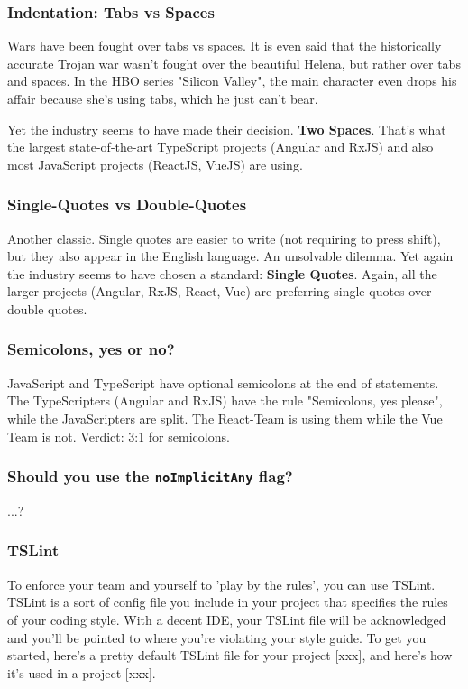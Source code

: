 \documentclass[12pt,a4paper]{report}
\begin{document}
\subsubsection{Indentation: Tabs vs Spaces}
Wars have been fought over tabs vs spaces. It is even said that the historically accurate Trojan war wasn't fought over the beautiful Helena, but rather over tabs and spaces. In the HBO series "Silicon Valley", the main character even drops his affair because she's using tabs, which he just can't bear.

Yet the industry seems to have made their decision. \textbf{Two Spaces}. That's what the largest state-of-the-art TypeScript projects (Angular and RxJS) and also most JavaScript projects (ReactJS, VueJS) are using.

\subsubsection{Single-Quotes vs Double-Quotes}
Another classic. Single quotes are easier to write (not requiring to press shift), but they also appear in the English language. An unsolvable dilemma. Yet again the industry seems to have chosen a standard: \textbf{Single Quotes}. Again, all the larger projects (Angular, RxJS, React, Vue) are preferring single-quotes over double quotes.

\subsubsection{Semicolons, yes or no?}
JavaScript and TypeScript have optional semicolons at the end of statements. The TypeScripters (Angular and RxJS) have the rule "Semicolons, yes please", while the JavaScripters are split. The React-Team is using them while the Vue Team is not. Verdict: 3:1 for semicolons.

\subsubsection{Should you use the \texttt{noImplicitAny} flag?}
...?

\subsubsection{TSLint}
To enforce your team and yourself to 'play by the rules', you can use TSLint. TSLint is a sort of config file you include in your project that specifies the rules of your coding style. With a decent IDE, your TSLint file will be acknowledged and you'll be pointed to where you're violating your style guide. To get you started, here's a pretty default TSLint file for your project [xxx], and here's how it's used in a project [xxx].
\end{document}
